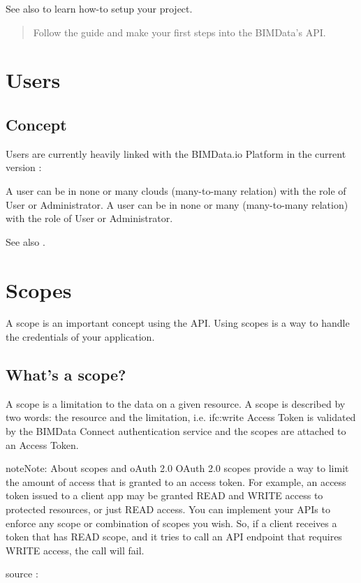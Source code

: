\documentclass[a4paper,12pt,english]{sphinxmanual}
\begin{document}


See also  to learn how-to setup your project.
\begin{quote}

Follow the guide and make your first steps into the BIMData’s API.
\end{quote}




\chapter{Users}
\label{\detokenize{users:users}}\label{\detokenize{users::doc}}

\section{Concept}
\label{\detokenize{users:concept}}
Users are currently heavily linked with the BIMData.io Platform in the current version : 

A user can be in none or many clouds (many-to-many relation) with the role of User or Administrator.
A user can be in none or many {\hyperref[\detokenize{projects::doc}]{}} (many-to-many relation) with the role of User or Administrator.




See also .




\chapter{Scopes}
\label{\detokenize{scopes:scopes}}\label{\detokenize{scopes::doc}}
A scope is an important concept using the API. Using scopes is a way to handle the credentials of your application.


\section{What’s a scope?}
\label{\detokenize{scopes:what-s-a-scope}}
A scope is a limitation to the data on a given resource. A scope is described by two words: the resource and the limitation, i.e. ifc:write
Access Token is validated by the BIMData Connect authentication service and the scopes are attached to an Access Token.

\begin{sphinxadmonition}{note}{Note:}
About scopes and oAuth 2.0
OAuth 2.0 scopes provide a way to limit the amount of access that is granted to an access token.
For example, an access token issued to a client app may be granted READ and WRITE access to protected resources, or just READ access. You can implement your APIs to enforce any scope or combination of scopes you wish. So, if a client receives a token that has READ scope, and it tries to call an API endpoint that requires WRITE access, the call will fail.

source : 
\end{sphinxadmonition}
\end{document}
